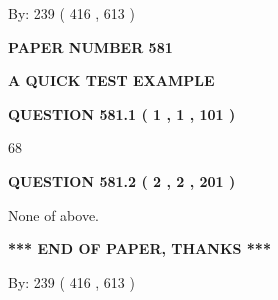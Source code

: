\documentclass[12pt]{article}
\begin{document}
   
\hspace{1.0in} By: 
 239 ( 416 ,  613 )
   
   
   
   
\newpage 
\setcounter{page}{ 
   581001 } 
   
   
   
   
 {\textbf{ \Large{ PAPER NUMBER  581  }}}
   
   
\vspace{0.2in}
   
   
   
   
   
   
 \vspace{0.2in}
{\LARGE {\textbf{ A QUICK TEST EXAMPLE}}}
   
   
  
\vspace{0.2in}
  
{\textbf{\Large{QUESTION
581.1 
 ( 1 , 1 , 101 )
}}}
  
  
 
 
\noindent{}

68
 
 
  
\vspace{0.2in}
  
{\textbf{\Large{QUESTION
581.2 
 ( 2 , 2 , 201 )
}}}
  
  
 
 
\noindent{}
 
 
 None of above.
 
 
 
 
   
   
 \vspace{0.2in}
 
   
   
   
   
\vspace{1.0in} 
{\textbf{\large{ *** END OF PAPER, THANKS *** }}} 
   
   
\hspace{1.0in} By: 
 239 ( 416 ,  613 )
   
   
   
   
\newpage 
\setcounter{page}{ 
   582001 } 
   
   
   
\end{document}
